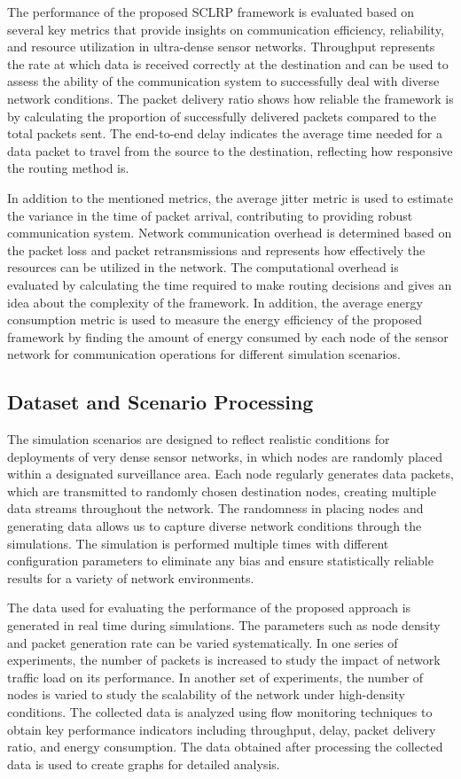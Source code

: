 \documentclass[a4paper,fleqn]{cas-dc}
\numberwithin{equation}{section}
\begin{document}
The performance of the proposed SCLRP framework is evaluated based on several key metrics that provide insights on communication efficiency, reliability, and resource utilization in ultra-dense sensor networks. Throughput represents the rate at which data is received correctly at the destination and can be used to assess the ability of the communication system to successfully deal with diverse network conditions. The packet delivery ratio shows how reliable the framework is by calculating the proportion of successfully delivered packets compared to the total packets sent. The end-to-end delay indicates the average time needed for a data packet to travel from the source to the destination, reflecting how responsive the routing method is.

In addition to the mentioned metrics, the average jitter metric is used to estimate the variance in the time of packet arrival, contributing to providing robust communication system. Network communication overhead is determined based on the packet loss and packet retransmissions and represents how effectively the resources can be utilized in the network. The computational overhead is evaluated by calculating the time required to make routing decisions and gives an idea about the complexity of the framework. In addition, the average energy consumption metric is used to measure the energy efficiency of the proposed framework by finding the amount of energy consumed by each node of the sensor network for communication operations for different simulation scenarios.

\subsection{Dataset and Scenario Processing}

The simulation scenarios are designed to reflect realistic conditions for deployments of very dense sensor networks, in which nodes are randomly placed within a designated surveillance area. Each node regularly generates data packets, which are transmitted to randomly chosen destination nodes, creating multiple data streams throughout the network. The randomness in placing nodes and generating data allows us to capture diverse network conditions through the simulations. The simulation is performed multiple times with different configuration parameters to eliminate any bias and ensure statistically reliable results for a variety of network environments.

The data used for evaluating the performance of the proposed approach is generated in real time during simulations. The parameters such as node density and packet generation rate can be varied systematically. In one series of experiments, the number of packets is increased to study the impact of network traffic load on its performance. In another set of experiments, the number of nodes is varied to study the scalability of the network under high-density conditions. The collected data is analyzed using flow monitoring techniques to obtain key performance indicators including throughput, delay, packet delivery ratio, and energy consumption. The data obtained after processing the collected data is used to create graphs for detailed analysis.
\end{document}
